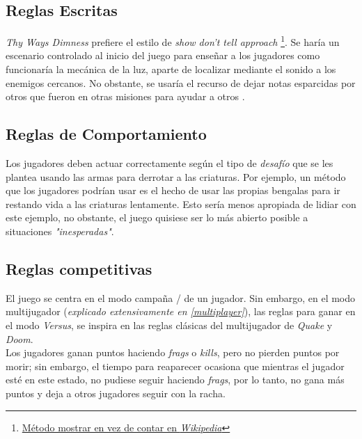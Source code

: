 \begin{multicols}{2}
    \subsection{Reglas Escritas} \label{reglasEscritas}
    \textit{Thy Ways Dimness} prefiere el estilo de \textit{show don't tell approach} \footnote{\href{https://en.wikipedia.org/wiki/Show,_don\%27t_tell}{Método mostrar en vez de contar en \textit{Wikipedia}}}. Se haría un escenario controlado al inicio del juego para enseñar a los jugadores como funcionaría la mecánica de la luz, aparte de localizar mediante el sonido a los enemigos cercanos.
    No obstante, se usaría el recurso de dejar notas esparcidas por otros \hunters que fueron en otras misiones para ayudar a otros \hunters.
    \subsection{Reglas de Comportamiento}
    Los jugadores deben actuar correctamente según el tipo de \textit{desafío} que se les plantea usando las armas para derrotar a las criaturas. Por ejemplo, un método que los jugadores podrían usar es el hecho de usar las propias bengalas para ir restando vida a las criaturas lentamente. Esto sería menos apropiada de lidiar con este ejemplo, no obstante, el juego quisiese ser lo más abierto posible a situaciones \textit{"inesperadas"}.
    \subsection{Reglas competitivas}
    El juego se centra en el modo campaña / de un jugador. Sin embargo, en el modo multijugador (\textit{explicado extensivamente en \ref{multiplayer}}), las reglas para ganar en el modo \textit{Versus}, se inspira en las reglas clásicas del multijugador de \textit{Quake} y \textit{Doom}.\\
    Los jugadores ganan puntos haciendo \textit{frags} o \textit{kills}, pero no pierden puntos por morir; sin embargo, el tiempo para reaparecer ocasiona que mientras el jugador esté en este estado, no pudiese seguir haciendo \textit{frags}, por lo tanto, no gana más puntos y deja a otros jugadores seguir con la racha.

\end{multicols}
